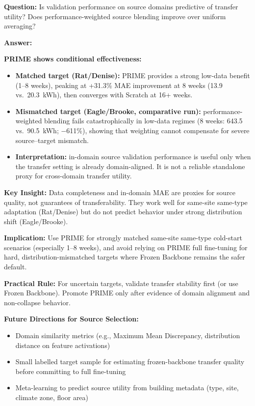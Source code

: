 \documentclass[12pt,a4paper]{report}
\begin{document}
\textbf{Question:} Is validation performance on source domains predictive of transfer utility? Does performance-weighted source blending improve over uniform averaging?

\textbf{Answer:}

\textbf{PRIME shows conditional effectiveness:}

\begin{itemize}
    \item \textbf{Matched target (Rat/Denise):} PRIME provides a strong low-data benefit (1--8 weeks), peaking at +31.3\% MAE improvement at 8 weeks (13.9 vs.\ 20.3~kWh), then converges with Scratch at 16+ weeks.
    \item \textbf{Mismatched target (Eagle/Brooke, comparative run):} performance-weighted blending fails catastrophically in low-data regimes (8 weeks: 643.5 vs.\ 90.5~kWh; $-$611\%), showing that weighting cannot compensate for severe source--target mismatch.
    \item \textbf{Interpretation:} in-domain source validation performance is useful only when the transfer setting is already domain-aligned. It is not a reliable standalone proxy for cross-domain transfer utility.
\end{itemize}

\textbf{Key Insight:} Data completeness and in-domain MAE are proxies for source quality, not guarantees of transferability. They work well for same-site same-type adaptation (Rat/Denise) but do not predict behavior under strong distribution shift (Eagle/Brooke).

\textbf{Implication:} Use PRIME for strongly matched same-site same-type cold-start scenarios (especially 1--8 weeks), and avoid relying on PRIME full fine-tuning for hard, distribution-mismatched targets where Frozen Backbone remains the safer default.

\textbf{Practical Rule:} For uncertain targets, validate transfer stability first (or use Frozen Backbone). Promote PRIME only after evidence of domain alignment and non-collapse behavior.

\textbf{Future Directions for Source Selection:}
\begin{itemize}
    \item Domain similarity metrics (e.g., Maximum Mean Discrepancy, distribution distance on feature activations)
    \item Small labelled target sample for estimating frozen-backbone transfer quality before committing to full fine-tuning
    \item Meta-learning to predict source utility from building metadata (type, site, climate zone, floor area)
\end{itemize}
\end{document}
